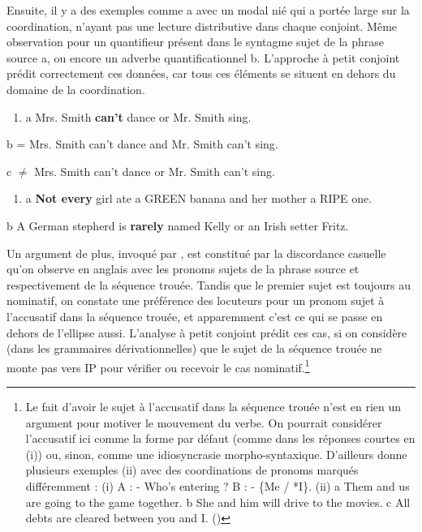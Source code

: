 Ensuite, il y a des exemples comme a avec un modal nié qui a portée large sur la coordination, n'ayant pas une lecture distributive dans chaque conjoint. Même observation pour un quantifieur présent dans le syntagme sujet de la phrase source a, ou encore un adverbe quantificationnel b. L'approche à petit conjoint prédit correctement ces données, car tous ces éléments se situent en dehors du domaine de la coordination. 


\begin{enumerate}
\item \label{bkm:Ref302325523}a  Mrs. Smith \textbf{can't} dance or Mr. Smith sing.  


\end{enumerate}
  b  = Mrs. Smith can't dance and Mr. Smith can't sing.

  c  ${\neq}$ Mrs. Smith can't dance or Mr. Smith can't sing.


\begin{enumerate}
\item \label{bkm:Ref289807683}a   \textbf{Not every} girl ate a GREEN banana and her mother a RIPE one.  


\end{enumerate}
b  A German stepherd is \textbf{rarely} named Kelly or an Irish setter Fritz.

Un argument de plus, invoqué par \citet{Siegel1987}, est constitué par la discordance casuelle qu'on observe en anglais avec les pronoms sujets de la phrase source et respectivement de la séquence trouée. Tandis que le premier sujet est toujours au nominatif, on constate une préférence des locuteurs pour un pronom sujet à l'accusatif dans la séquence trouée, et apparemment c'est ce qui se passe en dehors de l'ellipse aussi. L'analyse à petit conjoint prédit ces cas, si on considère (dans les grammaires dérivationnelles) que le sujet de la séquence trouée ne monte pas vers IP pour vérifier ou recevoir le cas nominatif.\footnote{Le fait d'avoir le sujet à l'accusatif dans la séquence trouée n'est en rien un argument pour motiver le mouvement du verbe. On pourrait considérer l'accusatif ici comme la forme par défaut (comme dans les réponses courtes en (i)) ou, sinon, comme une idiosyncrasie morpho-syntaxique. D'ailleurs \citet{Kim2006} donne plusieurs exemples (ii) avec des coordinations de pronoms marqués différemment :
(i)  A : - Who's entering ? B : - \{Me / *I\}. 
(ii)  a  Them and us are going to the game together.
  b  She and him will drive to the movies.
  c  All debts are cleared between you and I.            (\citet[603]{Kim2006})} 


